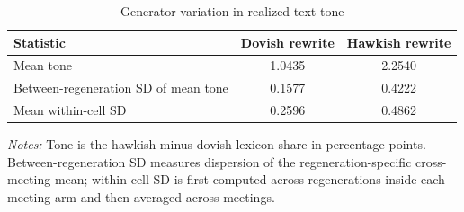 \begin{table}[htbp]
\color{revisionred}
\centering
\begin{threeparttable}
\caption{Generator variation in realized text tone}
\label{tab:crossdraw-tone}
\begin{footnotesize}
\begin{tabular}{lcc}
\toprule
Statistic & Dovish rewrite & Hawkish rewrite \\
\midrule
Mean tone & 1.0435 & 2.2540 \\
Between-regeneration SD of mean tone & 0.1577 & 0.4222 \\
Mean within-cell SD & 0.2596 & 0.4862 \\
\bottomrule
\end{tabular}
\begin{tablenotes}[flushleft]
\scriptsize
\item \textit{Notes:} Tone is the hawkish-minus-dovish lexicon share in percentage points. Between-regeneration SD measures dispersion of the regeneration-specific cross-meeting mean; within-cell SD is first computed across regenerations inside each meeting arm and then averaged across meetings.
\end{tablenotes}
\end{footnotesize}
\end{threeparttable}
\end{table}
